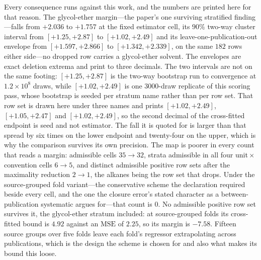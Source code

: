 Every consequence runs against this work, and the numbers are printed here for that reason. The
glycol-ether margin---the paper's one surviving stratified finding---falls from $+2.036$ to
$+1.757$ at the fixed estimator cell, its $90\%$ two-way cluster interval from $[+1.25,+2.87]$ to
$[+1.02,+2.49]$ and its leave-one-publication-out envelope from $[+1.597,+2.866]$ to
$[+1.342,+2.339]$, on the same $182$ rows either side---no dropped row carries a glycol-ether
solvent. The envelopes are exact deletion extrema and print to three decimals. The two intervals
are not on the same footing: $[+1.25,+2.87]$ is the two-way bootstrap run to convergence at
$1.2\times10^{8}$ draws, while $[+1.02,+2.49]$ is one $3000$-draw replicate of this scoring pass,
whose bootstrap is seeded per stratum name rather than per row set. That
row set is drawn here under three names and prints $[+1.02,+2.49]$, $[+1.05,+2.47]$ and
$[+1.02,+2.49]$, so the second decimal of the cross-fitted endpoint is seed and not estimator.
The fall it is quoted for is larger than that spread by six times on the lower endpoint and
twenty-four on the upper, which is why the comparison survives its own precision.
The map is poorer in every count that reads a margin: admissible cells $35\to32$,
strata admissible in all four unit\,$\times$\,convention cells $6\to5$, and distinct admissible
positive row sets after the maximality reduction $2\to1$, the alkanes being the row set that
drops. Under the source-grouped fold variant---the conservative scheme the declaration required
beside every cell, and the one the closure error's stated character as a between-publication
systematic argues for---that count is $0$. No admissible positive row set survives it, the
glycol-ether stratum included: at source-grouped folds its cross-fitted bound is $4.92$ against an
$\mathrm{MSE}$ of $2.25$, so its margin is $-7.58$. Fifteen source groups over five folds leave each
fold's regressor extrapolating across publications, which is the design the scheme is chosen for and
also what makes its bound this loose.
